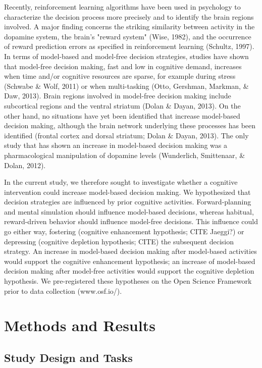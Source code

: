 \documentclass[11pt]{article} %
\begin{document}
Recently, reinforcement learning algorithms have been used in psychology to characterize the decision process more precisely and to identify the brain regions involved. A major finding concerns the striking similarity between activity in the dopamine system, the brain's "reward system" (Wise, 1982), and the occurrence of reward prediction errors as specified in reinforcement learning (Schultz, 1997). In terms of model-based and model-free decision strategies, studies have shown that model-free decision making, fast and low in cognitive demand, increases when time and/or cognitive resources are sparse, for example during stress (Schwabe \& Wolf, 2011) or when multi-tasking (Otto, Gershman, Markman, \& Daw, 2013). Brain regions involved in model-free decision making include subcortical regions and the ventral striatum (Dolan \& Dayan, 2013). On the other hand, no situations have yet been identified that increase model-based decision making, although the brain network underlying these processes has been identified (frontal cortex and dorsal striatum; Dolan \& Dayan, 2013). The only study that has shown an increase in model-based decision making was a pharmacological manipulation of dopamine levels (Wunderlich, Smittenaar, \& Dolan, 2012). 

In the current study, we therefore sought to investigate whether a cognitive intervention could increase model-based decision making. We hypothesized that decision strategies are influenced by prior cognitive activities. Forward-planning and mental simulation should influence model-based decisions, whereas habitual, reward-driven behavior should influence model-free decisions. This influence could go either way, fostering (cognitive enhancement hypothesis; CITE Jaeggi?) or depressing (cognitive depletion hypothesis; CITE) the subsequent decision strategy. An increase in model-based decision making after model-based activities would support the cognitive enhancement hypothesis; an increase of model-based decision making after model-free activities would support the cognitive depletion hypothesis. We pre-registered these hypotheses on the Open Science Framework prior to data collection (www.osf.io/).

\section{Methods and Results}
\subsection{Study Design and Tasks}
\end{document}
